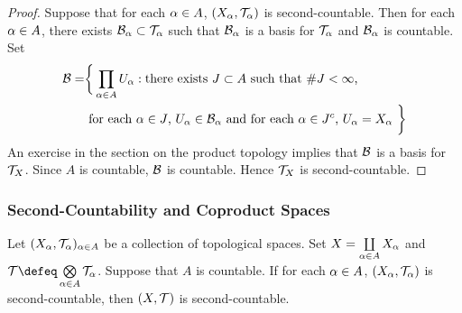 \documentclass{book}
\begin{document}
	\begin{proof}
		Suppose that for each $\alpha \in A$, $(X_{\alpha}, \mathcal{T}_{\alpha})$ is second-countable. Then for each  $\alpha \in A$, there exists $\mathcal{B}_{\alpha} \subset \mathcal{T}_{\alpha}$ such that $\mathcal{B}_{\alpha}$ is a basis for $\mathcal{T}_{\alpha}$ and $\mathcal{B}_{\alpha}$ is countable. Set 
		\begin{align*}
			\mathcal{B} = 
			& \bigg \{\prod_{\alpha \in A} U_{\alpha}: \text{there exists $J \subset A$ such that $ \# J < \infty$, } \\
			& \text{ for each $\alpha \in J$, $U_{\alpha} \in \mathcal{B}_{\alpha}$ and for each $\alpha \in J^c$, $U_{\alpha} = X_{\alpha}$ } \bigg \}
		\end{align*}  
		An exercise in the section on the product topology implies that $\mathcal{B}$ is a basis for $\mathcal{T}_X$. Since $A$ is countable, $\mathcal{B}$ is countable. Hence $\mathcal{T}_X$ is second-countable. 
	\end{proof}




































	\subsubsection{Second-Countability and Coproduct Spaces}	
	
	\begin{ex} 
			Let $(X_{\alpha}, \mathcal{T}_{\alpha})_{\alpha \in A}$ be a collection of topological spaces. Set $X = \coprod\limits_{\alpha \in A} X_{\alpha}$ and $\MT \defeq \bigotimes\limits_{\al \in A} \MT_{\al}$. Suppose that $A$ is countable. If for each $\alpha \in A$, $(X_{\alpha}, \mathcal{T}_{\alpha})$ is second-countable, then $(X, \mathcal{T})$ is second-countable. 
	\end{ex}
\end{document}
